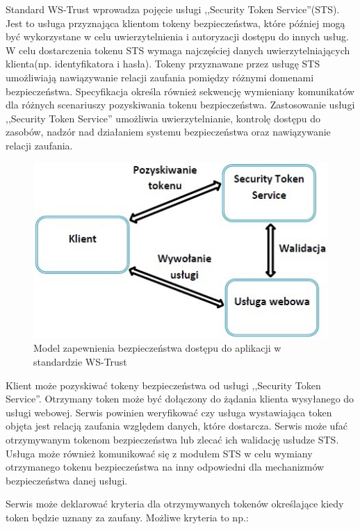 		Standard WS-Trust wprowadza pojęcie usługi ,,Security Token Service''(STS). Jest to usługa przyznająca klientom tokeny bezpieczeństwa, które później mogą być wykorzystane w celu uwierzytelnienia i autoryzacji dostępu do innych usług. W celu dostarczenia tokenu STS wymaga najczęściej danych uwierzytelniających klienta(np. identyfikatora i hasła). Tokeny przyznawane przez usługę STS umożliwiają nawiązywanie relacji zaufania pomiędzy różnymi domenami bezpieczeństwa. Specyfikacja określa również sekwencję wymieniany komunikatów dla różnych scenariuszy pozyskiwania tokenu bezpieczeństwa. Zastosowanie usługi ,,Security Token Service'' umożliwia uwierzytelnianie, kontrolę dostępu do zasobów, nadzór nad działaniem systemu bezpieczeństwa oraz nawiązywanie relacji zaufania.

		\begin{figure}[h]
			\centering
				\includegraphics{img/ws-trust.jpg}
			\caption{Model zapewnienia bezpieczeństwa dostępu do aplikacji w standardzie WS-Trust}
			\label{Model zapewnienia bezpieczeństwa dostępu do aplikacji w standardzie WS-Trust}
		\end{figure}

		Klient może pozyskiwać tokeny bezpieczeństwa od usługi ,,Security Token Service''. Otrzymany token może być dołączony do żądania klienta wysyłanego do usługi webowej. Serwis powinien weryfikować czy usługa wystawiająca token objęta jest relacją zaufania względem danych, które dostarcza. Serwis może ufać otrzymywanym tokenom bezpieczeństwa lub zlecać ich walidację usłudze STS. Usługa może również komunikować się z modułem STS w celu wymiany otrzymanego tokenu bezpieczeństwa na inny odpowiedni dla mechanizmów bezpieczeństwa danej usługi. 

		Serwis może deklarować kryteria dla otrzymywanych tokenów określające kiedy token będzie uznany za zaufany\cite{WS-Trust-1.4-with-errata}. Możliwe kryteria to np.:


